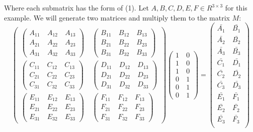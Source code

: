 \documentclass[a4paper,12pt]{article}
\begin{document}
Where each submatrix has the form of (1). Let $A,B,C,D,E,F \in \!R^{3\times 3}$ for this example. We will generate two matrices and multiply them to the matrix $M$:
\[\begin{pmatrix} \begin{pmatrix} A_{1 1} &\ A_{1 2} &\ A_{1 3}\\
						 A_{2 1} &\ A_{2 2} &\ A_{2 3}\\
                         A_{3 1} &\ A_{3 2} &\ A_{3 3}\end{pmatrix} &\ \begin{pmatrix} B_{1 1} &\ B_{1 2} &\ B_{1 3}\\
						 B_{2 1} &\ B_{2 2} &\ B_{2 3}\\
                         B_{3 1} &\ B_{3 2} &\ B_{3 3}\end{pmatrix} \\ \begin{pmatrix} C_{1 1} &\ C_{1 2} &\ C_{1 3}\\
						 C_{2 1} &\ C_{2 2} &\ C_{2 3}\\
                         C_{3 1} &\ C_{3 2} &\ C_{3 3}\end{pmatrix} &\ \begin{pmatrix} D_{1 1} &\ D_{1 2} &\ D_{1 3}\\
						 D_{2 1} &\ D_{2 2} &\ D_{2 3}\\
                         D_{3 1} &\ D_{3 2} &\ D_{3 3}\end{pmatrix} \\ \begin{pmatrix} E_{1 1} &\ E_{1 2} &\ E_{1 3}\\
						 E_{2 1} &\ E_{2 2} &\ E_{2 3}\\
                         E_{3 1} &\ E_{3 2} &\ E_{3 3}\end{pmatrix} &\ \begin{pmatrix} F_{1 1} &\ F_{1 2} &\ F_{1 3}\\
						 F_{2 1} &\ F_{2 2} &\ F_{2 3}\\
                         F_{3 1} &\ F_{3 2} &\ F_{3 3}\end{pmatrix} \end{pmatrix} \begin{pmatrix} 1 &\ 0 \\ 1 &\ 0 \\ 1 &\ 0 \\0 &\ 1 \\ 0 &\ 1 \\ 0 &\ 1 \end{pmatrix} = 
\begin{pmatrix} \bar{A_1} &\ \bar{B_1} \\ \bar{A_2} &\ \bar{B_2} \\\bar{A_3} &\ \bar{B_3} \\\bar{C_1} &\ \bar{D_1} \\\bar{C_2} &\ \bar{D_2} \\\bar{C_3} &\ \bar{D_3} \\\bar{E_1} &\ \bar{F_1} \\\bar{E_2} &\ \bar{F_2} \\\bar{E_3} &\ \bar{F_3} \\ \end{pmatrix} \]
\end{document}

